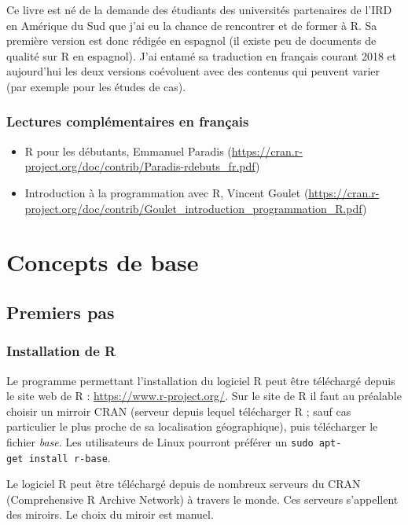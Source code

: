 \documentclass[]{book}
\providecommand{\tightlist}{%
  \setlength{\itemsep}{0pt}\setlength{\parskip}{0pt}}
\theoremstyle{definition}
\theoremstyle{definition}
\theoremstyle{definition}
\theoremstyle{remark}
\begin{document}
Ce livre est né de la demande des étudiants des universités partenaires
de l'IRD en Amérique du Sud que j'ai eu la chance de rencontrer et de
former à R. Sa première version est donc rédigée en espagnol (il existe
peu de documents de qualité sur R en espagnol). J'ai entamé sa
traduction en français courant 2018 et aujourd'hui les deux versions
coévoluent avec des contenus qui peuvent varier (par exemple pour les
études de cas).

\section{Lectures complémentaires en
français}\label{lectures-complementaires-en-francais}

\begin{itemize}
\tightlist
\item
  R pour les débutants, Emmanuel Paradis
  (\url{https://cran.r-project.org/doc/contrib/Paradis-rdebuts_fr.pdf})
\item
  Introduction à la programmation avec R, Vincent Goulet
  (\url{https://cran.r-project.org/doc/contrib/Goulet_introduction_programmation_R.pdf})
\end{itemize}

\part{Concepts de base}\label{part-concepts-de-base}

\chapter{Premiers pas}\label{premiersPas}

\section{Installation de R}\label{installation-de-r}

Le programme permettant l'installation du logiciel R peut être
téléchargé depuis le site web de R : \url{https://www.r-project.org/}.
Sur le site de R il faut au préalable choisir un mirroir CRAN (serveur
depuis lequel télécharger R ; sauf cas particulier le plus proche de sa
localisation géographique), puis télécharger le fichier \emph{base}. Les
utilisateurs de Linux pourront préférer un
\texttt{sudo\ apt-get\ install\ r-base}.

Le logiciel R peut être téléchargé depuis de nombreux serveurs du CRAN
(Comprehensive R Archive Network) à travers le monde. Ces serveurs
s'appellent des miroirs. Le choix du miroir est manuel.
\end{document}
